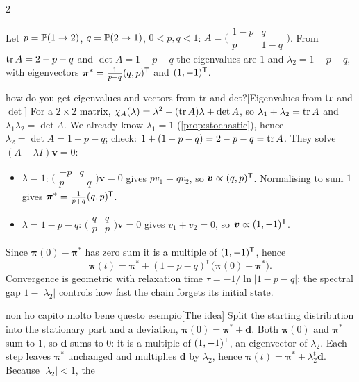 \begin{paracol}{2}
\begin{example}\label{ex:twostate}
Let $p=\mathbb{P}(1\to2)$, $q=\mathbb{P}(2\to1)$, $0<p,q<1$:
$A=\bigl(\begin{smallmatrix}1-p & q\\ p & 1-q\end{smallmatrix}\bigr)$. From $\operatorname{tr} A=2-p-q$ and
$\det A=1-p-q$ the eigenvalues are $1$ and $\lambda_2=1-p-q$, with eigenvectors
$\bm\pi^*=\frac{1}{p+q}(q,p)^{\mathsf T}$ and $(1,-1)^{\mathsf T}$.\begin{answer}{how do you get eigenvalues and vectors from tr and det?}[Eigenvalues from $\operatorname{tr}$ and $\det$]
For a $2\times2$ matrix, $\chi_A(\lambda)=\lambda^2-(\operatorname{tr} A)\lambda+\det A$,
so $\lambda_1+\lambda_2=\operatorname{tr} A$ and $\lambda_1\lambda_2=\det A$. We already know $\lambda_1=1$
(\cref{prop:stochastic}), hence $\lambda_2=\det A=1-p-q$; check: $1+(1-p-q)=2-p-q=\operatorname{tr} A$.
They solve $(A-\lambda I)\bm v=0$:
\begin{itemize}
  \item $\lambda=1$: $\bigl(\begin{smallmatrix}-p&q\\ p&-q\end{smallmatrix}\bigr)\bm v=0$ gives $pv_1=qv_2$,
        so $\bm v\propto(q,p)^{\mathsf T}$. Normalising to sum $1$ gives $\bm\pi^*=\frac1{p+q}(q,p)^{\mathsf T}$.
  \item $\lambda=1-p-q$: $\bigl(\begin{smallmatrix}q&q\\ p&p\end{smallmatrix}\bigr)\bm v=0$ gives $v_1+v_2=0$,
        so $\bm v\propto(1,-1)^{\mathsf T}$.
\end{itemize}
\end{answer} Since $\bm\pi(0)-\bm\pi^*$ has zero sum it is a multiple of
$(1,-1)^{\mathsf T}$, hence
\[
  \bm\pi(t) = \bm\pi^* + (1-p-q)^t\,\bigl(\bm\pi(0)-\bm\pi^*\bigr).
\]
Convergence is geometric with relaxation time $\tau=-1/\ln|1-p-q|$: the spectral gap $1-|\lambda_2|$
controls how fast the chain forgets its initial state.
\end{example}\begin{answer}{non ho capito molto bene questo esempio}[The idea]
Split the starting distribution into the stationary part and a deviation,
$\bm\pi(0)=\bm\pi^*+\bm d$. Both $\bm\pi(0)$ and $\bm\pi^*$ sum to $1$, so $\bm d$ sums to $0$: it is a
multiple of $(1,-1)^{\mathsf T}$, an eigenvector of $\lambda_2$. Each step leaves $\bm\pi^*$ unchanged and
multiplies $\bm d$ by $\lambda_2$, hence $\bm\pi(t)=\bm\pi^*+\lambda_2^t\bm d$. Because $|\lambda_2|<1$, the

\end{answer}
\end{paracol}
